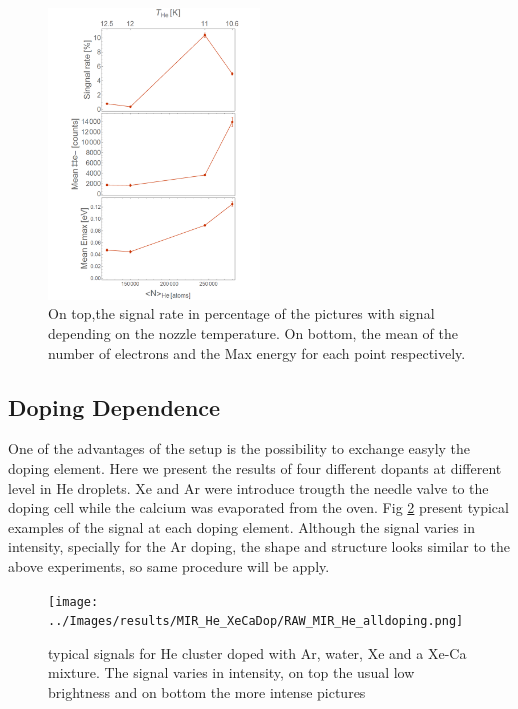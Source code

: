 \begin{figure}[h!]
\centering
\includegraphics[width=0.5\textwidth]{../Images/results/Mir_He_Dropletsize/Alltogether.png} 
\caption[MIR He droplet size dependence]{On top,the signal rate in percentage of the pictures with signal depending on the nozzle temperature. On bottom, the mean of the number of electrons and the Max energy for each point respectively.}
\label{fig:Alldropletsize}
\end{figure}

\subsection{Doping Dependence}

One of the advantages of the setup is the possibility to exchange easyly the doping element. Here we present the results of four different dopants at different level in He droplets. Xe and Ar were introduce trougth the needle valve to the doping cell while the calcium was evaporated from the oven. Fig \ref{fig:He-dopingexample} present typical examples of the signal at each doping element. Although the signal varies in intensity, specially for the Ar doping, the  shape and structure looks similar to the above experiments, so same procedure will be apply.

\begin{figure}[h!]
\centering
\texttt{[image: ../Images/results/MIR\_He\_XeCaDop/RAW\_MIR\_He\_alldoping.png]} 
\caption[MIR He Doping examples]{typical signals for He cluster doped with Ar, water, Xe and a Xe-Ca mixture. The signal varies in intensity, on top the usual low brightness and on bottom the more intense pictures}
\label{fig:He-dopingexample}
\end{figure}

